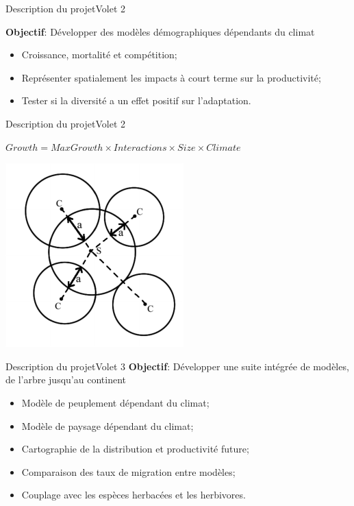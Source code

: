 \documentclass{eecslides}
\begin{document}
	\begin{frame}{Description du projet}{Volet 2}

	\textbf{Objectif}: Développer des modèles démographiques dépendants du climat

		\begin{itemize}
			\item Croissance, mortalité et compétition;  
			\item Représenter spatialement les impacts à court terme sur la productivité;
			\item Tester si la diversité a un effet positif sur l'adaptation. 
		\end{itemize}
		
	\end{frame}

	
	\begin{frame}{Description du projet}{Volet 2}

		\begin{center}
			$Growth = MaxGrowth \times Interactions\times Size \times Climate $
		\end{center}
		
		\begin{center}
		\includegraphics[height=0.4\textheight]{neighborhood}\\
		\end{center}
		
	\end{frame}

	
	\begin{frame}{Description du projet}{Volet 3}
	\textbf{Objectif}: Développer une suite intégrée de modèles, de l'arbre jusqu'au continent 

		\begin{itemize}
			\item Modèle de peuplement dépendant du climat;
			\item Modèle de paysage dépendant du climat;
			\item Cartographie de la distribution et productivité future;
			\item Comparaison des taux de migration entre modèles;
			\item Couplage avec les espèces herbacées et les herbivores.
		\end{itemize}
	\end{frame}
\end{document}
